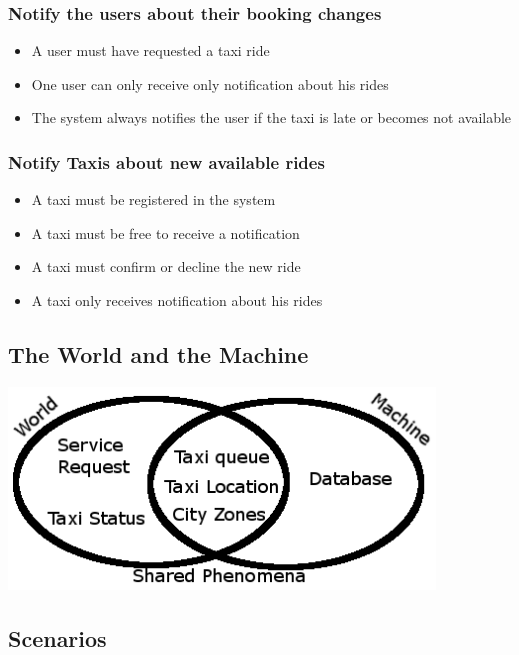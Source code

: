 		\subsubsection{Notify the users about their booking changes}
		\begin{itemize}
			\item A user must have requested a taxi ride
			\item One user can only receive only notification about his rides
			\item The system always notifies the user if the taxi is late or becomes not available
		\end{itemize}
		\subsubsection{Notify Taxis about new available rides}
		\begin{itemize}
			\item A taxi must be registered in the system
			\item A taxi must be free to receive a notification
			\item A taxi must confirm or decline the new ride
			\item A taxi only receives notification about his rides
		\end{itemize}
	\subsection{The World and the Machine}
	\begin{center}
		\includegraphics[width=0.85\textwidth]{./images/ellissi}
	\end{center}
	\subsection{Scenarios}
